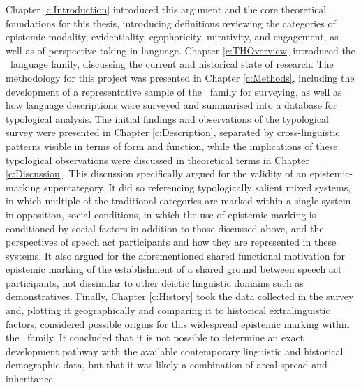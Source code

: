 Chapter \ref{c:Introduction} introduced this argument and the core theoretical foundations for this thesis, introducing definitions reviewing the categories of epistemic modality, evidentiality, egophoricity, mirativity, and engagement, as well as of perspective-taking in language. Chapter \ref{c:THOverview} introduced the \lfam\ language family, discussing the current and historical state of research. The methodology for this project was presented in Chapter \ref{c:Methods}, including the development of a representative sample of the \lfam\ family for surveying, as well as how language descriptions were surveyed and summarised into a database for typological analysis. The initial findings and observations of the typological survey were presented in Chapter \ref{c:Description}, separated by cross-linguistic patterns visible in terms of form and function, while the implications of these typological observations were discussed in theoretical terms in Chapter \ref{c:Discussion}. This discussion specifically argued for the validity of an epistemic-marking supercategory. It did so referencing typologically salient mixed systems, in which multiple of the traditional categories are marked within a single system in opposition, social conditions, in which the use of epistemic marking is conditioned by social factors in addition to those discussed above, and the perspectives of speech act participants and how they are represented in these systems. It also argued for the aforementioned shared functional motivation for epistemic marking of the establishment of a shared ground between speech act participants, not dissimilar to other deictic linguistic domains such as demonstratives. Finally, Chapter \ref{c:History} took the data collected in the survey and, plotting it geographically and comparing it to historical extralinguistic factors, considered possible origins for this widespread epistemic marking within the \lfam\ family. It concluded that it is not possible to determine an exact development pathway with the available contemporary linguistic and historical demographic data, but that it was likely a combination of areal spread and inheritance.


